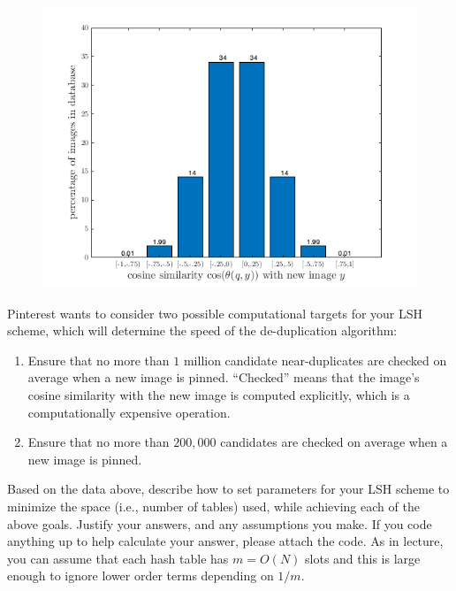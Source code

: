 \documentclass[10pt]{article}
\begin{document}
\begin{figure}[H]
	\centering
	\includegraphics[width=.6\textwidth]{dist.png}
\end{figure} 

Pinterest wants to consider two possible computational targets for your LSH scheme, which will determine the speed of the de-duplication algorithm:
\begin{enumerate}
	\item Ensure that no more than $1$ million candidate near-duplicates are checked on average when a new image is pinned. ``Checked'' means that the image's cosine similarity with the new image is computed explicitly, which is a computationally expensive operation.
	\item Ensure that no more than $200,000$ candidates are checked on average when a new image is pinned.
\end{enumerate}

\noindent Based on the data above, describe how to set parameters for your LSH scheme to minimize the space (i.e., number of tables) used, while achieving each of the above goals. Justify your answers, and any assumptions you make.
If you code anything up to help calculate your answer, please attach the code. As in lecture, you can assume that each hash table has $m = O(N)$ slots and this is large enough to ignore lower order terms depending on $1/m$. 
\end{document}
